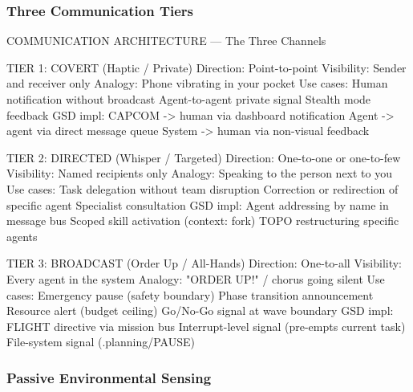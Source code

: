 \documentclass[11pt,letterpaper]{article}
\begin{document}
\subsubsection{Three Communication Tiers}

\begin{asciibox}
COMMUNICATION ARCHITECTURE — The Three Channels

  TIER 1: COVERT (Haptic / Private)
    Direction: Point-to-point
    Visibility: Sender and receiver only
    Analogy:   Phone vibrating in your pocket
    Use cases: Human notification without broadcast
               Agent-to-agent private signal
               Stealth mode feedback
    GSD impl:  CAPCOM -> human via dashboard notification
               Agent -> agent via direct message queue
               System -> human via non-visual feedback

  TIER 2: DIRECTED (Whisper / Targeted)
    Direction: One-to-one or one-to-few
    Visibility: Named recipients only
    Analogy:   Speaking to the person next to you
    Use cases: Task delegation without team disruption
               Correction or redirection of specific agent
               Specialist consultation
    GSD impl:  Agent addressing by name in message bus
               Scoped skill activation (context: fork)
               TOPO restructuring specific agents

  TIER 3: BROADCAST (Order Up / All-Hands)
    Direction: One-to-all
    Visibility: Every agent in the system
    Analogy:   "ORDER UP!" / chorus going silent
    Use cases: Emergency pause (safety boundary)
               Phase transition announcement
               Resource alert (budget ceiling)
               Go/No-Go signal at wave boundary
    GSD impl:  FLIGHT directive via mission bus
               Interrupt-level signal (pre-empts current task)
               File-system signal (.planning/PAUSE)
\end{asciibox}

\subsubsection{Passive Environmental Sensing}
\end{document}
